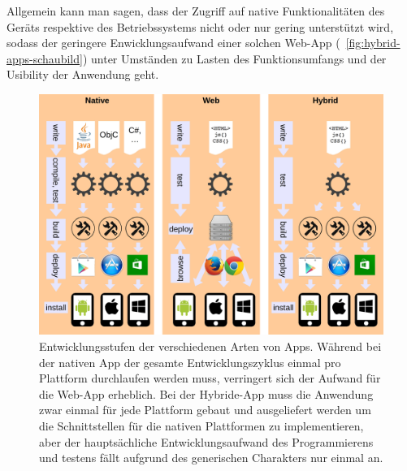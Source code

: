 Allgemein kann man sagen, dass der Zugriff auf native Funktionalitäten des Geräts respektive des Betriebssystems nicht oder nur gering unterstützt wird, sodass der geringere Enwicklungsaufwand einer solchen Web-App (\seename\  \autoref{fig:hybrid-apps-schaubild}) unter Umständen zu Lasten des Funktionsumfangs und der Usibility der Anwendung geht.



\begin{figure}
\centering
\includegraphics[width=1\linewidth]{./images/hybrid-apps-schaubild}
\caption[Schaubild Hybrid Apps]{Entwicklungsstufen der verschiedenen Arten von Apps. Während bei der nativen App der gesamte Entwicklungszyklus einmal pro Plattform durchlaufen werden muss, verringert sich der Aufwand für die Web-App erheblich. Bei der Hybride-App muss die Anwendung zwar einmal für jede Plattform gebaut und ausgeliefert werden um die Schnittstellen für die nativen Plattformen zu implementieren, aber der hauptsächliche Entwicklungsaufwand des Programmierens und testens fällt aufgrund des generischen Charakters nur einmal an.}
\label{fig:hybrid-apps-schaubild}
\end{figure}

